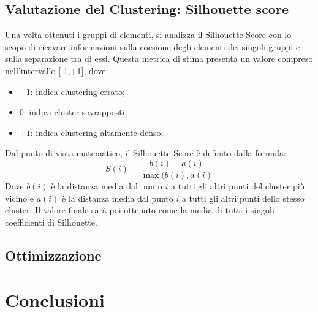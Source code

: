 \documentclass[12pt,oneside]{article}
\begin{document}
    \begin{enumerate}
    \subsection{Valutazione del Clustering: Silhouette score}
    \begin{justify}
        Una volta ottenuti i gruppi di elementi, si analizza il Silhouette Score con lo scopo di ricavare informazioni sulla coesione degli elementi dei singoli gruppi e sulla separazione tra di essi. Questa metrica di stima presenta un valore compreso nell’intervallo [-1,+1], dove:
        \begin{itemize}
            \item $-1$: indica clustering errato;
    	\item  $0$: indica cluster sovrapposti;
    	\item $+1$: indica clustering altamente denso;
        \end{itemize}
        Dal punto di vista matematico, il Silhouette Score è definito dalla formula:
        \[
        S(i) = \frac{b(i) - a(i)}{\max(b(i), a(i)}
        \]
        Dove $b(i)$ è la distanza media dal punto $i$ a tutti gli altri punti del cluster più vicino e $a(i)$ è la distanza media dal punto $i$ a tutti gli altri punti dello stesso cluster.
        Il valore finale sarà poi ottenuto come la media di tutti i singoli coefficienti di Silhouette.
    \end{justify}
    \end{enumerate}

     \begin{enumerate}
     \subsection{Ottimizzazione}
     \end{enumerate}
\section{Conclusioni}

    
\end{document}
